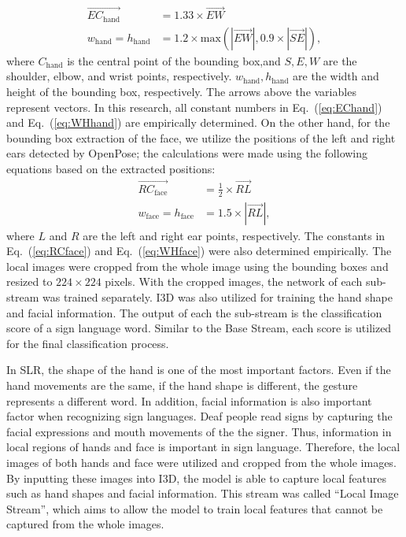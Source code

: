 \documentclass[journal]{IEEEtran}
\begin{document}
\begin{align}
    \label{eq:EChand}
    \overrightarrow{EC_\textrm{hand}} &= 1.33 \times \overrightarrow{EW} \\
    \label{eq:WHhand}
    w_\textrm{hand} = h_\textrm{hand} &= 1.2 \times \textrm{max}(|\overrightarrow{EW}|, 0.9 \times |\overrightarrow{SE}|),
\end{align}
where $C_{\mathrm{hand}}$ is the central point of the bounding box,and $S, E, W$ are the shoulder, elbow, and wrist points, respectively. 
$w_{\mathrm{hand}}, h_{\mathrm{hand}}$ are the width and height of the bounding box, respectively. The arrows above the variables represent vectors. 
In this research, all constant numbers in Eq.~(\ref{eq:EChand}) and Eq.~(\ref{eq:WHhand}) are empirically determined. 
On the other hand, for the bounding box extraction of the face, 
we utilize the positions of the left and right ears detected by OpenPose; the calculations were made using the following equations based on the extracted positions: 
\begin{align}
    \label{eq:RCface}
    \overrightarrow{RC_\textrm{face}} &= \frac{1}{2} \times \overrightarrow{RL} \\
    \label{eq:WHface}
    w_\textrm{face} = h_\textrm{face} &= 1.5 \times |\overrightarrow{RL}|,
\end{align}
where $L$ and $R$ are the left and right ear points, respectively. The constants in Eq.~(\ref{eq:RCface}) and Eq.~(\ref{eq:WHface}) were also determined empirically. 
The local images were cropped from the whole image using the bounding boxes and resized to $224 \times 224$ pixels. With the cropped images, the network of each sub-stream was trained separately. I3D was also utilized for training the hand shape and facial information. The output of each the sub-stream is the classification score of a sign language word. Similar to the Base Stream, each score is utilized for the final classification process. 

In SLR, the shape of the hand is one of the most important factors.
Even if the hand movements are the same, if the hand shape is different, the gesture represents a different word.
In addition, facial information is also important factor when recognizing sign languages.
Deaf people read signs by capturing the facial expressions and mouth movements of the the signer.
Thus, information in local regions of hands and face is important in sign language.
Therefore, the local images of both hands and face were utilized and cropped from the whole images.
By inputting these images into I3D, the model is able to capture local features such as hand shapes and facial information.
This stream was called ``Local Image Stream'', which aims to allow the model to train local features that cannot be captured from the whole images.
\end{document}
